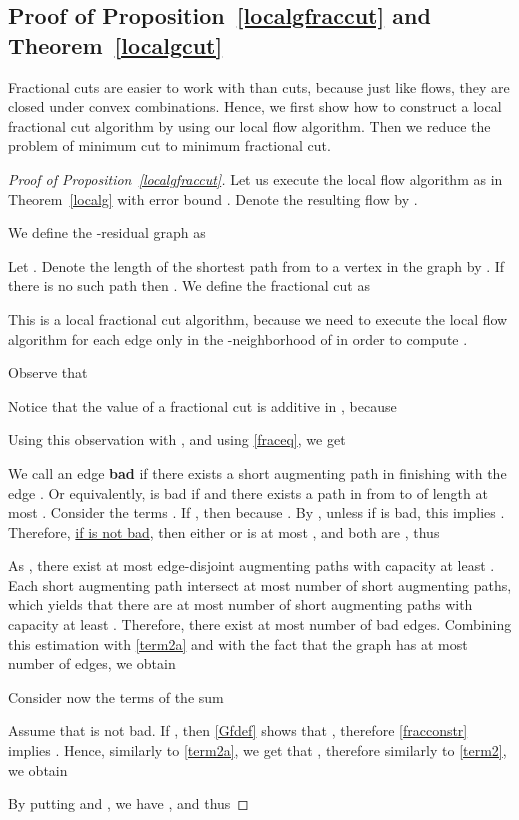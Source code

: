 \documentclass[12pt,a4paper]{article}
\renewcommand{\:}{\colon}
\begin{document}
\subsection{Proof of Proposition~\ref{localgfraccut} and Theorem~\ref{localgcut}}\label{subsec:fraccut}

Fractional cuts are easier to work with than cuts, because just like flows, they are closed under convex combinations. 
Hence, we first show how to construct a local fractional cut algorithm by using our local flow algorithm. 
Then we reduce the problem of minimum cut to minimum fractional cut. 

\begin{proof}[Proof of Proposition~\ref{localgfraccut}]
Let us execute the local flow algorithm as in Theorem~\ref{localg} with error bound . Denote the resulting flow by .

We define the -residual graph as


Let . 
Denote the length of the shortest path from  to a vertex  in the graph  by . 
If there is no such path then . 
We define the fractional cut  as

This is a local fractional cut algorithm, because we need to execute the local flow algorithm for each edge only in the -neighborhood of  in order to compute .

Observe that







Notice that the value of a fractional cut  is additive in , because




Using this observation with , and using \eqref{fraceq}, we get



We call an edge  \textbf{bad} if there exists a short augmenting path in  finishing with the edge . 
Or equivalently,  is bad if  and there exists a path in  from  to  of length at most . 
Consider the terms . If , then  because .
By , unless if  is bad, this implies . 
Therefore, \underline{if  is not bad}, then either  or  is at most , and both are , thus


As , there exist at most  edge-disjoint augmenting paths with capacity at least . 
Each short augmenting path intersect at most  number of short augmenting paths, which yields that there are at most  number of short augmenting paths with capacity at least . 
Therefore, there exist at most  number of bad edges. 
Combining this estimation with \eqref{term2a} and with the fact that the graph has at most  number of edges, we obtain


Consider now the terms of the sum

Assume that  is not bad. If , then \eqref{Gfdef} shows that , therefore \eqref{fracconstr} implies . Hence, similarly to \eqref{term2a}, we get that , therefore similarly to \eqref{term2}, we obtain


By putting  and , we have , and thus 


\end{proof}
\end{document}
